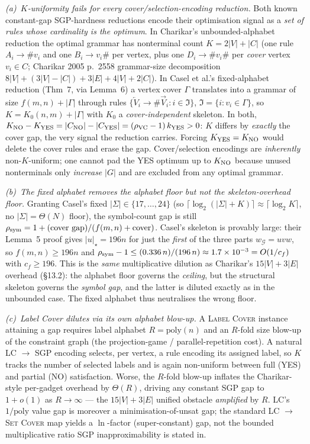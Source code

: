 \documentclass[
]{article}
\begin{document}
\emph{(a)~$K$-uniformity fails for every cover/selection-encoding
reduction.} Both known constant-gap SGP-hardness reductions encode
their optimisation signal as a \emph{set of rules whose cardinality
is the optimum}. In Charikar's unbounded-alphabet reduction the
optimal grammar has nonterminal count $K = 2|V| + |C|$ (one rule
$A_i \to \#v_i$ and one $B_i \to v_i\#$ per vertex, plus one
$D_i \to \#v_i\#$ per \emph{cover} vertex $v_i \in C$; Charikar 2005
p.~2558 grammar-size decomposition $8|V| + (3|V|-|C|) + 3|E| + 4|V|
+ 2|C|$). In Casel et al.'s fixed-alphabet reduction (Thm~7, via
Lemma~6) a vertex cover $\Gamma$ translates into a grammar of size
$f(m,n) + |\Gamma|$ through rules $\{\overleftarrow{V}_i \to
\#\overrightarrow{V}_i : i \in \mathfrak{I}\}$, $\mathfrak{I} =
\{i : v_i \in \Gamma\}$, so $K = K_0(n,m) + |\Gamma|$ with $K_0$ a
\emph{cover-independent} skeleton. In both, $K_{\rm NO} - K_{\rm YES}
= |C_{\rm NO}| - |C_{\rm YES}| = (\rho_{\rm VC} - 1)\,k_{\rm YES} > 0$:
$K$ differs by \emph{exactly} the cover gap, the very signal the
reduction carries. Forcing $K_{\rm YES} = K_{\rm NO}$ would delete the
cover rules and erase the gap. Cover/selection encodings are
\emph{inherently} non-$K$-uniform; one cannot pad the YES optimum up
to $K_{\rm NO}$ because unused nonterminals only \emph{increase} $|G|$
and are excluded from any optimal grammar.

\emph{(b)~The fixed alphabet removes the alphabet floor but not the
skeleton-overhead floor.} Granting Casel's fixed $|\Sigma| \in
\{17,\dots,24\}$ (so $\lceil \log_2(|\Sigma|+K)\rceil \approx
\lceil \log_2 K\rceil$, no $|\Sigma| = \Theta(N)$ floor), the
symbol-count gap is still $\rho_{\rm sym} = 1 + (\text{cover
gap})/(f(m,n) + \text{cover})$. Casel's skeleton is provably large:
their Lemma~5 proof gives $|u|_\star = 196n$ for just the \emph{first}
of the three parts $w_{\mathcal G} = uvw$, so $f(m,n) \geq 196n$ and
$\rho_{\rm sym} - 1 \leq (0.336\,n)/(196\,n) \approx 1.7 \times
10^{-3} = O(1/c_f)$ with $c_f \geq 196$. This is the \emph{same}
multiplicative dilution as Charikar's $15|V| + 3|E|$ overhead
(\S13.2): the alphabet floor governs the \emph{ceiling}, but the
structural skeleton governs the \emph{symbol gap}, and the latter is
diluted exactly as in the unbounded case. The fixed alphabet thus
neutralises the wrong floor.

\emph{(c)~Label Cover dilutes via its own alphabet blow-up.} A
\textsc{Label Cover} instance attaining a gap requires label
alphabet $R = \mathrm{poly}(n)$ and an $R$-fold size blow-up of the
constraint graph (the projection-game / parallel-repetition cost).
A natural \textsc{LC} $\to$ SGP encoding selects, per vertex, a rule
encoding its assigned label, so $K$ tracks the number of selected
labels and is again non-uniform between full (YES) and partial (NO)
satisfaction. Worse, the $R$-fold blow-up inflates the Charikar-style
per-gadget overhead by $\Theta(R)$, driving any constant SGP gap to
$1 + o(1)$ as $R \to \infty$ --- the $15|V| + 3|E|$ unified obstacle
\emph{amplified} by $R$. \textsc{LC}'s $1/\mathrm{poly}$ value gap is
moreover a minimisation-of-unsat gap; the standard \textsc{LC} $\to$
\textsc{Set Cover} map yields a $\ln$-factor (super-constant) gap, not
the bounded multiplicative ratio SGP inapproximability is stated in.
\end{document}
